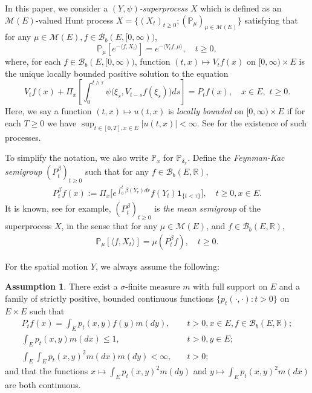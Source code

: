 \documentclass[12pt,a4paper]{amsart}
\numberwithin{equation}{section}
\theoremstyle{plain}
\theoremstyle{definition}
\newtheorem{asp}{Assumption}
\begin{document}
\par
In this paper, we consider a \emph{$(Y,\psi)$-superprocess} $X$ which is defined as an $\mathcal M(E)$-valued Hunt process $X=\{(X_t)_{t\geq 0}; (\mathbb
P_\mu)_{\mu \in \mathcal M(E)}\}$ satisfying that for any $\mu \in \mathcal M(E), f\in \mathcal B_b(E, [0,\infty))$,
\begin{equation}
  \label{eq:_def_of_vtf}
  \mathbb P_\mu [e^{-\langle f,X_t\rangle}] = e^{-\langle V_tf, \mu\rangle},
  \quad t\geq 0,
\end{equation}
where, for each $f\in\mathcal B_b(E, [0,\infty))$, function $(t,x) \mapsto V_tf(x)$ on $[0,\infty) \times E$ is the unique locally bounded positive solution to the
equation
\begin{equation}\label{eq:FKPP_in_definition}
  V_t f(x) +   \Pi_x\left[\int_0^{t\wedge \tau} \psi \big(\xi_s,V_{t-s} f(\xi_s)\big) ds\right]
	= P_t f(x),
	\quad x \in E,\,\, t \geq 0.
\end{equation}
Here, we say a function $(t,x)\mapsto u(t,x)$ is \emph{locally bounded} on $[0,\infty) \times E$ if for each $T\geq 0$ we have $\sup_{t\in [0,T],x\in E} |u(t,x)| < \infty$. 
See \cite[Theorem 5.11]{Li2011Measurevalued} for the existence of such processes.
\par
To simplify the notation, we also write $\mathbb P_x$ for $\mathbb P_{\delta_x}$.
Define the \emph{Feynman-Kac semigroup} $(P^\beta_t)_{t\geq 0}$ such that for any $ f\in \mathcal B_b(E,\mathbb R)$,
\begin{align}
	P^\beta_tf(x)
	:= \Pi_x \big[e^{\int_0^{t} \beta(Y_r)dr} f(Y_t)\mathbf 1_{\{t<\tau\}}\big],
	\quad t\geq 0, x\in E.
\end{align}
It is known, see \cite[Proposition 2.27]{Li2011Measurevalued} for example, $(P^\beta_t)_{t\geq 0}$ is \emph{the mean semigroup} of the superprocess $X$, in the sense that for any $\mu \in \mathcal M(E)$, and $f \in \mathcal B_b(E,\mathbb R)$,
\begin{align} \label{eq:Yaglom_type_result_without_2rd} 
\mathbb P_\mu [\langle f,X_t\rangle] = \mu(P^\beta_t f), \quad t \geq 0.
\end{align}
\par
For the spatial motion $Y$, we always assume the following:
\begin{asp}\label{asp:1}
  There exist a $\sigma$-finite measure $m$ with full support on $E$ and a family
  of strictly positive, bounded continuous functions $\{ p_t(\cdot,\cdot): t > 0
  \}$ on $E \times E$ such that
  \begin{align}
  	P_tf(x)
  	= \int_E p_t(x,y) f(y) m(dy),
  	&\quad t>0, x \in E,f \in \mathcal B_b(E,\mathbb R);
  	\\ \int_E p_t(x,y)m(dx)\leq 1, &\quad t>0,y\in E;
  	\\ \int_E \int_E p_t(x,y)^2 m(dx) m(dy)
  	<\infty,
  	&\quad t> 0;
  \end{align}
  and that the functions $x \mapsto \int_E p_t(x,y)^2 m(dy)$ and $y \mapsto \int_E
  p_t(x,y)^2 m(dx)$ are both continuous.
\end{asp}
\end{document}
